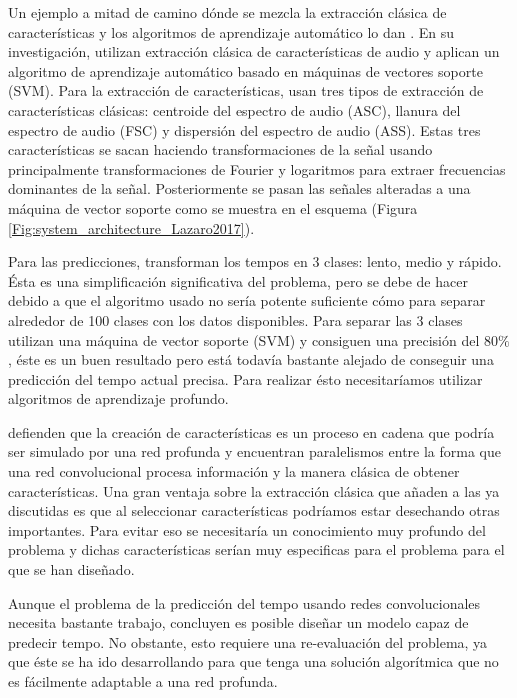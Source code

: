 Un ejemplo a mitad de camino dónde se mezcla la extracción clásica de características y los algoritmos de aprendizaje automático lo dan \cite{Lazaro2017MusicTC}. En su investigación, \cite{Lazaro2017MusicTC} utilizan extracción clásica de características de audio y aplican un algoritmo de aprendizaje automático basado en máquinas de vectores soporte (SVM). Para la extracción de características, usan tres tipos de extracción de características clásicas: centroide del espectro de audio (ASC), llanura del espectro de audio (FSC) y dispersión del espectro de audio (ASS). Estas tres características se sacan haciendo transformaciones de la señal usando principalmente transformaciones de Fourier y logaritmos para extraer frecuencias dominantes de la señal. Posteriormente se pasan las señales alteradas a una máquina de vector soporte como se muestra en el esquema (Figura \ref{Fig:system_architecture_Lazaro2017}).

Para las predicciones, \citeauthor{Lazaro2017MusicTC} transforman los tempos en 3 clases: lento, medio y rápido. Ésta es una simplificación significativa del problema, pero se debe de hacer debido a que el algoritmo usado no sería potente suficiente cómo para separar alrededor de 100 clases con los datos disponibles. Para separar las 3 clases utilizan una máquina de vector soporte (SVM) y consiguen una precisión del $80\%$, éste es un buen resultado pero está todavía bastante alejado de conseguir una predicción del tempo actual precisa. Para realizar ésto necesitaríamos utilizar algoritmos de aprendizaje profundo.

\cite{humphrey:2012} defienden que la creación de características es un proceso en cadena que podría ser simulado por una red profunda y encuentran paralelismos entre la forma que una red convolucional procesa información y la manera clásica de obtener características. Una gran ventaja sobre la extracción clásica que añaden a las ya discutidas es que al seleccionar características podríamos estar desechando otras importantes. Para evitar eso se necesitaría un conocimiento muy profundo del problema y dichas características serían muy especificas para el problema para el que se han diseñado. 

Aunque el problema de la predicción del tempo usando redes convolucionales necesita bastante trabajo, \cite{humphrey:2012} concluyen es posible diseñar un modelo capaz de predecir tempo. No obstante, esto requiere una re-evaluación del problema, ya que éste se ha ido desarrollando para que tenga una solución algorítmica que no es fácilmente adaptable a una red profunda.

